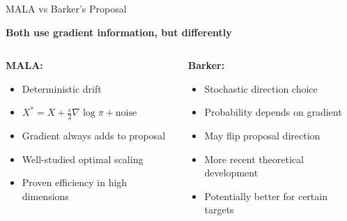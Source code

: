 \documentclass[aspectratio=169]{beamer}
\begin{document}
\begin{frame}{MALA vs Barker's Proposal}

\begin{center}
\large \textbf{Both use gradient information, but differently}
\end{center}

\vspace{0.5em}

\begin{columns}
\begin{column}{0.48\textwidth}
\textbf{MALA:}
\begin{itemize}
    \item Deterministic drift
    \item $X^* = X + \frac{\epsilon}{2}\nabla\log\pi + \text{noise}$
    \item Gradient always adds to proposal
    \item Well-studied optimal scaling
    \item Proven efficiency in high dimensions
\end{itemize}
\end{column}
\begin{column}{0.48\textwidth}
\textbf{Barker:}
\begin{itemize}
    \item Stochastic direction choice
    \item Probability depends on gradient
    \item May flip proposal direction
    \item More recent theoretical development
    \item Potentially better for certain targets
\end{itemize}
\end{column}
\end{columns}

\vspace{1em}

\begin{center}
\end{center}
\end{frame}
\end{document}
